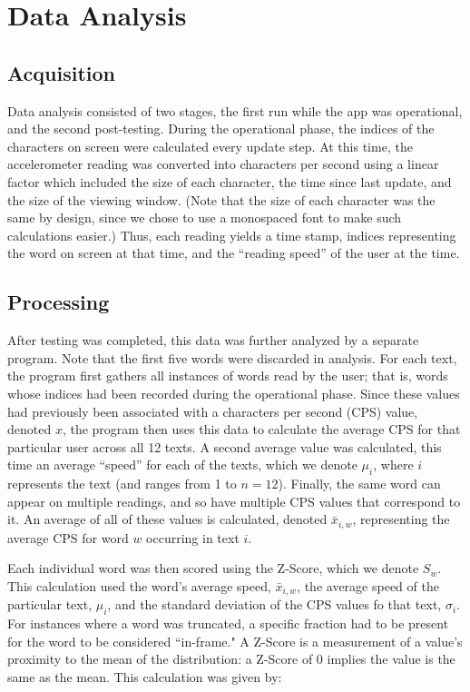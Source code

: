 \documentclass[11pt,letterpaper]{article}
\begin{document}
	\section{Data Analysis}
	
	\subsection{Acquisition}
	
	Data analysis consisted of two stages, the first run while the app was operational, and the second post-testing. During the operational phase, the indices of the characters on screen were calculated every update step. At this time, the accelerometer reading was converted into characters per second using a linear factor which included the size of each character, the time since last update, and the size of the viewing window. (Note that the size of each character was the same by design, since we chose to use a monospaced font to make such calculations easier.) Thus, each reading yields a time stamp, indices representing the word on screen at that time, and the ``reading speed'' of the user at the time.
	
	\subsection{Processing}
	
	After testing was completed, this data was further analyzed by a separate program. Note that the first five words were discarded in analysis. For each text, the program first gathers all instances of words read by the user; that is, words whose indices had been recorded during the operational phase. Since these values had previously been associated with a characters per second (CPS) value, denoted $x$, the program then uses this data to calculate the average CPS for that particular user across all 12 texts. A second average value was calculated, this time an average ``speed'' for each of the texts, which we denote $\mu_i$, where $i$ represents the text (and ranges from 1 to $n=12$). Finally, the same word can appear on multiple readings, and so have multiple CPS values that correspond to it. An average of all of these values is calculated, denoted $\bar{x}_{i,w}$, representing the average CPS for word $w$ occurring in text $i$.
	
	Each individual word was then scored using the Z-Score, which we denote $S_w$. This calculation used the word's average speed, $\bar{x}_{i,w}$, the average speed of the particular text, $\mu_i$, and the standard deviation of the CPS values fo that text, $\sigma_i$. For instances where a word was truncated, a specific fraction had to be present for the word to be considered ``in-frame." A Z-Score is a measurement of a value's proximity to the mean of the distribution: a Z-Score of 0 implies the value is the same as the mean. This calculation was given by:
	
\end{document}
